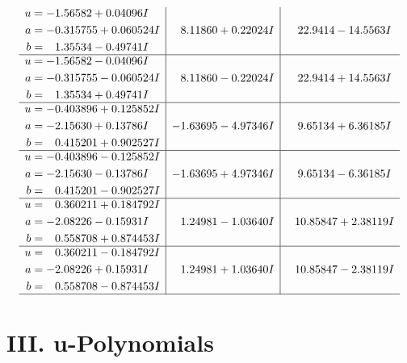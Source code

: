 \documentclass[1p]{elsarticle_modified}
\theoremstyle{definition}
\begin{document}
$$\begin{array}{c|c|c}
\begin{aligned}
u &= -1.56582 + 0.04096 I \\
a &= -0.315755 + 0.060524 I \\
b &= \phantom{-}1.35534 - 0.49741 I\end{aligned}
 & \phantom{-}8.11860 + 0.22024 I & \phantom{-}22.9414 - 14.5563 I \\ \hline\begin{aligned}
u &= -1.56582 - 0.04096 I \\
a &= -0.315755 - 0.060524 I \\
b &= \phantom{-}1.35534 + 0.49741 I\end{aligned}
 & \phantom{-}8.11860 - 0.22024 I & \phantom{-}22.9414 + 14.5563 I \\ \hline\begin{aligned}
u &= -0.403896 + 0.125852 I \\
a &= -2.15630 + 0.13786 I \\
b &= \phantom{-}0.415201 + 0.902527 I\end{aligned}
 & -1.63695 - 4.97346 I & \phantom{-}9.65134 + 6.36185 I \\ \hline\begin{aligned}
u &= -0.403896 - 0.125852 I \\
a &= -2.15630 - 0.13786 I \\
b &= \phantom{-}0.415201 - 0.902527 I\end{aligned}
 & -1.63695 + 4.97346 I & \phantom{-}9.65134 - 6.36185 I \\ \hline\begin{aligned}
u &= \phantom{-}0.360211 + 0.184792 I \\
a &= -2.08226 - 0.15931 I \\
b &= \phantom{-}0.558708 + 0.874453 I\end{aligned}
 & \phantom{-}1.24981 - 1.03640 I & \phantom{-}10.85847 + 2.38119 I \\ \hline\begin{aligned}
u &= \phantom{-}0.360211 - 0.184792 I \\
a &= -2.08226 + 0.15931 I \\
b &= \phantom{-}0.558708 - 0.874453 I\end{aligned}
 & \phantom{-}1.24981 + 1.03640 I & \phantom{-}10.85847 - 2.38119 I\\
 \hline 
 \end{array}$$\newpage
\newpage\renewcommand{\arraystretch}{1}
\centering \section*{ III. u-Polynomials}
\end{document}
